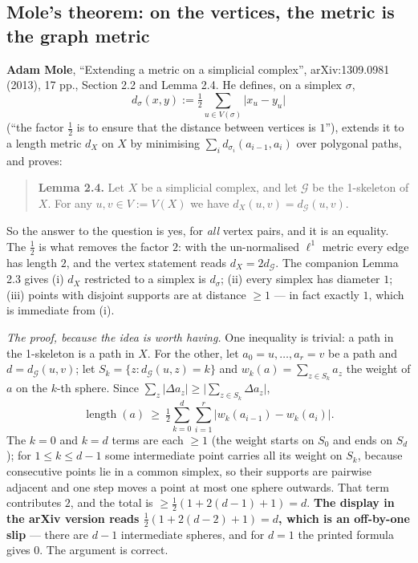 \documentclass[
]{article}
\begin{document}
\subsection{Mole's theorem: on the vertices, the metric is the graph
metric}\label{moles-theorem-on-the-vertices-the-metric-is-the-graph-metric}

\textbf{Adam Mole}, ``Extending a metric on a simplicial complex'',
arXiv:1309.0981 (2013), 17 pp., Section 2.2 and Lemma 2.4. He defines,
on a simplex \(\sigma\), \[
d_\sigma(x,y):=\tfrac12\sum_{u\in V(\sigma)}\lvert x_u-y_u\rvert
\] (``the factor \(\tfrac12\) is to ensure that the distance between
vertices is \(1\)''), extends it to a length metric \(d_X\) on \(X\) by
minimising \(\sum_i d_{\sigma_i}(a_{i-1},a_i)\) over polygonal paths,
and proves:

\begin{quote}
\textbf{Lemma 2.4.} Let \(X\) be a simplicial complex, and let
\(\mathcal G\) be the 1-skeleton of \(X\). For any \(u,v\in V:=V(X)\) we
have \(d_X(u,v)=d_{\mathcal G}(u,v)\).
\end{quote}

So the answer to the question is yes, for \emph{all} vertex pairs, and
it is an equality. The \(\tfrac12\) is what removes the factor \(2\):
with the un-normalised \(\ell^1\) metric every edge has length \(2\),
and the vertex statement reads \(d_X=2d_{\mathcal G}\). The companion
Lemma 2.3 gives (i) \(d_X\) restricted to a simplex is \(d_\sigma\);
(ii) every simplex has diameter \(1\); (iii) points with disjoint
supports are at distance \(\ge 1\) --- in fact exactly \(1\), which is
immediate from (i).

\emph{The proof, because the idea is worth having.} One inequality is
trivial: a path in the 1-skeleton is a path in \(X\). For the other, let
\(a_0=u,\dots,a_r=v\) be a path and \(d=d_{\mathcal G}(u,v)\); let
\(S_k=\{z: d_{\mathcal G}(u,z)=k\}\) and \(w_k(a)=\sum_{z\in S_k}a_z\)
the weight of \(a\) on the \(k\)-th sphere. Since
\(\sum_z\lvert\Delta a_z\rvert\ge\lvert\sum_{z\in S_k}\Delta a_z\rvert\),
\[
\operatorname{length}(a)\ \ge\ \tfrac12\sum_{k=0}^{d}\sum_{i=1}^{r}\lvert w_k(a_{i-1})-w_k(a_i)\rvert .
\] The \(k=0\) and \(k=d\) terms are each \(\ge 1\) (the weight starts
on \(S_0\) and ends on \(S_d\)); for \(1\le k\le d-1\) some intermediate
point carries all its weight on \(S_k\), because consecutive points lie
in a common simplex, so their supports are pairwise adjacent and one
step moves a point at most one sphere outwards. That term contributes
\(2\), and the total is \(\ge\tfrac12(1+2(d-1)+1)=d\). \textbf{The
display in the arXiv version reads \(\tfrac12(1+2(d-2)+1)=d\), which is
an off-by-one slip} --- there are \(d-1\) intermediate spheres, and for
\(d=1\) the printed formula gives \(0\). The argument is correct.
\end{document}
